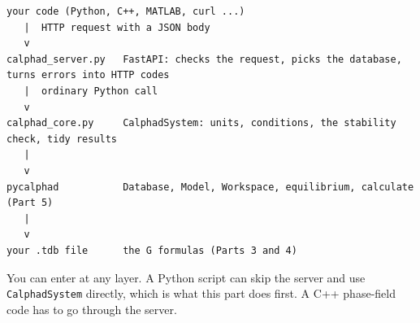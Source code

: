\documentclass[12pt,a4paper]{article}
\begin{document}
\begin{lstlisting}[basicstyle={\scriptsize\ttfamily}]
your code (Python, C++, MATLAB, curl ...)
   |  HTTP request with a JSON body
   v
calphad_server.py   FastAPI: checks the request, picks the database, turns errors into HTTP codes
   |  ordinary Python call
   v
calphad_core.py     CalphadSystem: units, conditions, the stability check, tidy results
   |
   v
pycalphad           Database, Model, Workspace, equilibrium, calculate (Part 5)
   |
   v
your .tdb file      the G formulas (Parts 3 and 4)
\end{lstlisting}
You can enter at any layer. A Python script can skip the server and use \texttt{CalphadSystem} directly, which is what this part does first. A C++ phase-field code has to go through the server.


\end{document}
